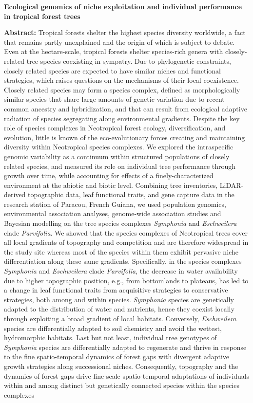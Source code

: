 {\begin{center}
\textbf{Ecological genomics of niche exploitation and individual performance in tropical forest trees} \\
\end{center} 
\textbf{Abstract:}
Tropical forests shelter the highest species diversity worldwide, a fact that remains partly unexplained and the origin of which is subject to debate. Even at the hectare-scale, tropical forests shelter species-rich genera with closely-related tree species coexisting in sympatry. Due to phylogenetic constraints, closely related species are expected to have similar niches and functional strategies, which raises questions on the mechanisms of their local coexistence. Closely related species may form a species complex, defined as morphologically similar species that share large amounts of genetic variation due to recent common ancestry and hybridization, and that can result from ecological adaptive radiation of species segregating along environmental gradients. Despite the key role of species complexes in Neotropical forest ecology, diversification, and evolution, little is known of the eco-evolutionary forces creating and maintaining diversity within Neotropical species complexes. We explored the intraspecific genomic variability as a continuum within structured populations of closely related species, and measured its role on individual tree performance through growth over time, while accounting for effects of a finely-characterized environment at the abiotic and biotic level. Combining tree inventories, LiDAR-derived topographic data, leaf functional traits, and gene capture data in the research station of Paracou, French Guiana, we used population genomics, environmental association analyses, genome-wide association studies and Bayesian modelling on the tree species complexes \emph{Symphonia} and \emph{Eschweilera} clade \emph{Parvifolia}. We showed that the species complexes of Neotropical trees cover all local gradients of topography and competition and are therefore widespread in the study site whereas most of the species within them exhibit pervasive niche differentiation along these same gradients. Specifically, in the species complexes \emph{Symphonia} and \emph{Eschweilera} clade \emph{Parvifolia}, the decrease in water availability due to higher topographic position, e.g., from bottomlands to plateaus, has led to a change in leaf functional traits from acquisitive strategies to conservative strategies, both among and within species. \emph{Symphonia} species are genetically adapted to the distribution of water and nutrients, hence they coexist locally through exploiting a broad gradient of local habitats. Conversely, \emph{Eschweilera} species are differentially adapted to soil chemistry and avoid the wettest, hydromorphic habitats. Last but not least, individual tree genotypes of \emph{Symphonia} species are differentially adapted to regenerate and thrive in response to the fine spatio-temporal dynamics of forest gaps with divergent adaptive growth strategies along successional niches. Consequently, topography and the dynamics of forest gaps drive fine-scale spatio-temporal adaptations of individuals within and among distinct but genetically connected species within the species complexes }
